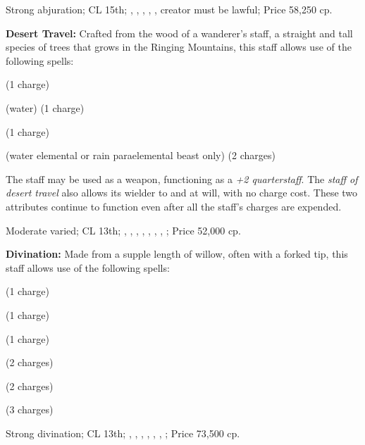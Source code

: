 Strong abjuration; CL 15th; , , , , , creator must be lawful; Price 58,250 cp.

\textbf{Desert Travel:} Crafted from the wood of a wanderer's staff, a straight and tall species of trees that grows in the Ringing Mountains, this staff allows use of the following spells:
\begin{itemize*}
\item {} (1 charge)
\item {} (water) (1 charge)
\item {} (1 charge)
\item {} (water elemental or rain paraelemental beast only) (2 charges)
\end{itemize*}

The staff may be used as a weapon, functioning as a \emph{+2 quarterstaff}. The \emph{staff of desert travel} also allows its wielder to  and  at will, with no charge cost. These two attributes continue to function even after all the staff's charges are expended.

Moderate varied; CL 13th; , , , , , , , ; Price 52,000 cp.

\textbf{Divination:} Made from a supple length of willow, often with a forked tip, this staff allows use of the following spells:
\begin{itemize*}
\item {} (1 charge)
\item {} (1 charge)
\item {} (1 charge)
\item {} (2 charges)
\item {} (2 charges)
\item {} (3 charges)
\end{itemize*}

Strong divination; CL 13th; , , , , , , ; Price 73,500 cp.

